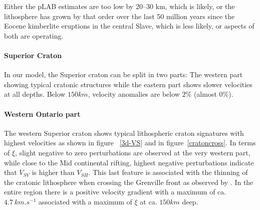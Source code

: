 \documentclass[12pt]{article}
\begin{document}
			{\color{red}Either the pLAB estimates are too low by 20–30 km, which is likely, or the lithosphere has grown by that order over the last 50 million years since the Eocene kimberlite eruptions in the central Slave, which is less likely, or aspects of both are operating.} \cite{jones2014electrical}




		\paragraph{Superior Craton}
			In our model, the Superior craton can be split in two parts: The western part showing typical cratonic structures while the eastern part shows slower velocities at all depths. Below $150km$, velocity anomalies are below $2\%$ (almost $0\%$). 

		\paragraph{Western Ontario part}
			The western Superior craton shows typical lithospheric craton signatures with highest velocities as shown in figure ~\ref{3d-VS} and in figure~\ref{cratoncross}. In terms of $\xi$, slight negative to zero perturbations are observed at the very western part, while close to the Mid continental rifting, highest negative perturbations indicate that $V_{SV}$ is higher than $V_{SH}$. This last feature is associated with the thinning of the cratonic lithosphere when crossing the Grenville front as observed by \cite{darbyshire2007new}.
			In the entire region there is a positive velocity gradient with a maximum of ca. $4.7 \: km.s^{-1}$  associated with a maximum of $\xi$ at ca. $150km$ deep.
			
\end{document}

